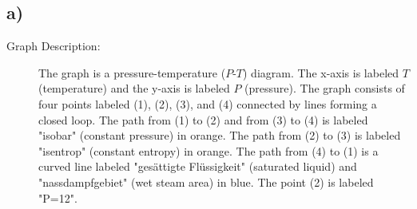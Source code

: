 

\subsection*{a)}

\begin{description}
    \item[Graph Description:] The graph is a pressure-temperature ($P$-$T$) diagram. The x-axis is labeled $T$ (temperature) and the y-axis is labeled $P$ (pressure). The graph consists of four points labeled (1), (2), (3), and (4) connected by lines forming a closed loop. The path from (1) to (2) and from (3) to (4) is labeled "isobar" (constant pressure) in orange. The path from (2) to (3) is labeled "isentrop" (constant entropy) in orange. The path from (4) to (1) is a curved line labeled "gesättigte Flüssigkeit" (saturated liquid) and "nassdampfgebiet" (wet steam area) in blue. The point (2) is labeled "P=12".
\end{description}